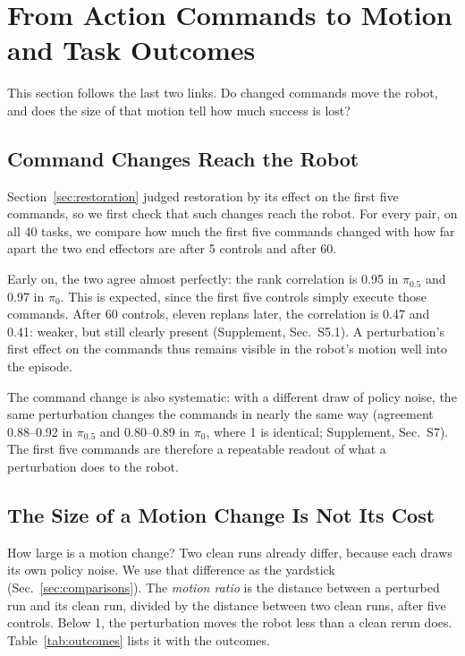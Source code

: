 \section{From Action Commands to Motion and Task Outcomes}
\label{sec:motion}
This section follows the last two links. Do changed commands move the robot, and does the size of that motion tell how much success is lost?



\subsection{Command Changes Reach the Robot}
\label{sec:early}
Section~\ref{sec:restoration} judged restoration by its effect on the first five commands, so we first check that such changes reach the robot. For every pair, on all 40 tasks, we compare how much the first five commands changed with how far apart the two end effectors are after 5 controls and after 60.

Early on, the two agree almost perfectly: the rank correlation is 0.95 in $\pi_{0.5}$ and 0.97 in $\pi_0$. This is expected, since the first five controls simply execute those commands. After 60 controls, eleven replans later, the correlation is 0.47 and 0.41: weaker, but still clearly present (Supplement, Sec.~S5.1). A perturbation's first effect on the commands thus remains visible in the robot's motion well into the episode.

The command change is also systematic: with a different draw of policy noise, the same perturbation changes the commands in nearly the same way (agreement 0.88--0.92 in $\pi_{0.5}$ and 0.80--0.89 in $\pi_0$, where 1 is identical; Supplement, Sec.~S7). The first five commands are therefore a repeatable readout of what a perturbation does to the robot.

\subsection{The Size of a Motion Change Is Not Its Cost}
\label{sec:sensitivity}
How large is a motion change? Two clean runs already differ, because each draws its own policy noise. We use that difference as the yardstick (Sec.~\ref{sec:comparisons}). The \emph{motion ratio} is the distance between a perturbed run and its clean run, divided by the distance between two clean runs, after five controls. Below 1, the perturbation moves the robot less than a clean rerun does. Table~\ref{tab:outcomes} lists it with the outcomes.

